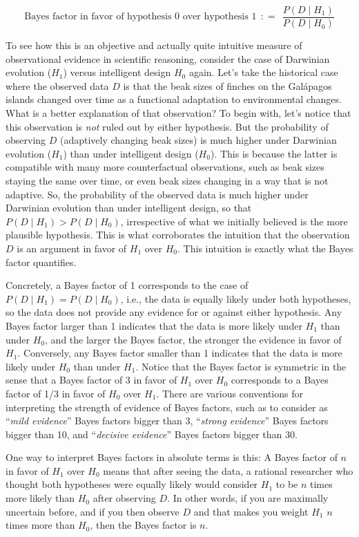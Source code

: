 \documentclass[
  doc,
  floatsintext,
  longtable,
  nolmodern,
  notxfonts,
  notimes,
  colorlinks=true,linkcolor=blue,citecolor=blue,urlcolor=blue]{apa7}
\begin{document}
\[
\text{Bayes factor in favor of hypothesis 0 over hypothesis 1} \ \  \colon\!= \ \ \frac{P(D \mid H_1)}{P(D \mid H_0)}
\]

To see how this is an objective and actually quite intuitive measure of
observational evidence in scientific reasoning, consider the case of
Darwinian evolution (\(H_1\)) versus intelligent design \(H_0\) again.
Let's take the historical case where the observed data \(D\) is that the
beak sizes of finches on the Galápagos islands changed over time as a
functional adaptation to environmental changes. What is a better
explanation of that observation? To begin with, let's notice that this
observation is \emph{not} ruled out by either hypothesis. But the
probability of observing \(D\) (adaptively changing beak sizes) is much
higher under Darwinian evolution (\(H_1\)) than under intelligent design
(\(H_0\)). This is because the latter is compatible with many more
counterfactual observations, such as beak sizes staying the same over
time, or even beak sizes changing in a way that is not adaptive. So, the
probability of the observed data is much higher under Darwinian
evolution than under intelligent design, so that
\(P(D \mid H_1) > P(D \mid H_0)\), irrespective of what we initially
believed is the more plausible hypothesis. This is what corroborates the
intuition that the observation \(D\) is an argument in favor of \(H_1\)
over \(H_0\). This intuition is exactly what the Bayes factor
quantifies.

Concretely, a Bayes factor of 1 corresponds to the case of
\(P(D \mid H_1) = P(D \mid H_0)\), i.e., the data is equally likely
under both hypotheses, so the data does not provide any evidence for or
against either hypothesis. Any Bayes factor larger than 1 indicates that
the data is more likely under \(H_1\) than under \(H_0\), and the larger
the Bayes factor, the stronger the evidence in favor of \(H_1\).
Conversely, any Bayes factor smaller than 1 indicates that the data is
more likely under \(H_0\) than under \(H_1\). Notice that the Bayes
factor is symmetric in the sense that a Bayes factor of 3 in favor of
\(H_1\) over \(H_0\) corresponds to a Bayes factor of 1/3 in favor of
\(H_0\) over \(H_1\). There are various conventions for interpreting the
strength of evidence of Bayes factors, such as to consider as
``\emph{mild evidence}'' Bayes factors bigger than 3, ``\emph{strong
evidence}'' Bayes factors bigger than 10, and ``\emph{decisive
evidence}'' Bayes factors bigger than 30.

One way to interpret Bayes factors in absolute terms is this: A Bayes
factor of \(n\) in favor of \(H_1\) over \(H_0\) means that after seeing
the data, a rational researcher who thought both hypotheses were equally
likely would consider \(H_1\) to be \(n\) times more likely than \(H_0\)
after observing \(D\). In other words, if you are maximally uncertain
before, and if you then observe \(D\) and that makes you weight \(H_1\)
\(n\) times more than \(H_0\), then the Bayes factor is \(n\).
\end{document}
